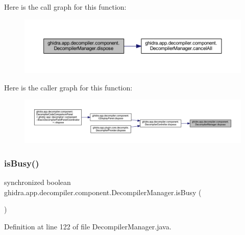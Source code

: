 Here is the call graph for this function\+:
\nopagebreak
\begin{figure}[H]
\begin{center}
\leavevmode
\includegraphics[width=350pt]{classghidra_1_1app_1_1decompiler_1_1component_1_1_decompiler_manager_a8f2694c41dd71e004e75a5603274865f_cgraph}
\end{center}
\end{figure}
Here is the caller graph for this function\+:
\nopagebreak
\begin{figure}[H]
\begin{center}
\leavevmode
\includegraphics[width=350pt]{classghidra_1_1app_1_1decompiler_1_1component_1_1_decompiler_manager_a8f2694c41dd71e004e75a5603274865f_icgraph}
\end{center}
\end{figure}
\mbox{\label{classghidra_1_1app_1_1decompiler_1_1component_1_1_decompiler_manager_a09fc0d005fa5d29e5a348cefbeb0e0ef}} 
\subsubsection{\texorpdfstring{isBusy()}{isBusy()}}
{\footnotesize\ttfamily synchronized boolean ghidra.\+app.\+decompiler.\+component.\+Decompiler\+Manager.\+is\+Busy (\begin{DoxyParamCaption}{ }\end{DoxyParamCaption})\hspace{0.3cm}{\ttfamily [inline]}}



Definition at line 122 of file Decompiler\+Manager.\+java.

